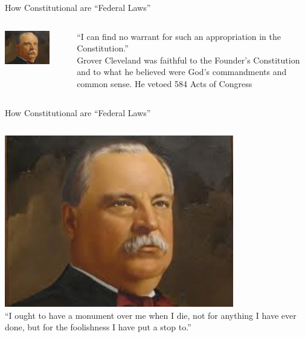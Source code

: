 \documentclass{beamer}
\begin{document}
\begin{frame}{How Constitutional are ``Federal Laws''}
    \begin{columns}[onlytextwidth]
            \centering
            \includegraphics[width=0.75\textwidth]{img/cleveland2.png} \\
            \pause

            ``I can find no warrant for such an appropriation in the Constitution.'' \\
            \vspace{15pt}
            Grover Cleveland was faithful to the Founder’s Constitution and to
            what he believed were God’s commandments and common sense.  He
            vetoed 584 Acts of Congress

    \end{columns}
\end{frame}

\begin{frame}{How Constitutional are ``Federal Laws''}
    \begin{columns}[onlytextwidth]
            \centering
            \includegraphics[width=0.75\textwidth]{img/cleveland2.png} \\

            ``I ought to have a monument over me when I die, not for anything I have ever done, but for the foolishness I have put a stop to.''

    \end{columns}
\end{frame}
\end{document}
